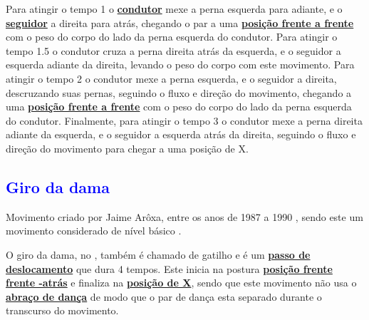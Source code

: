 Para atingir o tempo 1 o \hyperref[def:Condutor]{\textbf{condutor}} mexe a perna esquerda para adiante, 
e o \hyperref[def:Seguidor]{\textbf{seguidor}}  a direita para atrás,
chegando o par a uma \hyperref[def:frente-frente-position]{\textbf{posição frente a frente}}
com o peso do corpo do lado da perna esquerda do condutor.
Para atingir o tempo 1.5 o condutor cruza a perna direita atrás da esquerda,
e o seguidor a esquerda adiante da direita, levando o peso do corpo com este movimento.
Para atingir o tempo 2 o condutor mexe a perna esquerda, e o seguidor a direita,
descruzando suas pernas, seguindo o fluxo e direção do movimento,
chegando a uma \hyperref[def:frente-frente-position]{\textbf{posição frente a frente}}
com o peso do corpo do lado da perna esquerda do condutor.
Finalmente, para atingir o tempo 3 o condutor mexe a perna direita adiante da esquerda,
e o seguidor a esquerda atrás da direita, 
seguindo o fluxo e direção do movimento para chegar a uma posição de X. 

\subsection{\textcolor{blue}{Giro da dama}}
Movimento criado por Jaime Arôxa, entre os anos de 1987 a 1990 \cite{EntrevistaJaimeAroxa1},
sendo este um movimento considerado de nível básico \cite[pp. 144]{perna2002samba}.

O giro da dama, no \AnoLivro, também é chamado de gatilho e 
é um \hyperref[def:PassoDeDeslocamento]{\textbf{passo de deslocamento}} que dura 4 tempos.
Este inicia na postura \hyperref[def:ffa-position]{\textbf{posição frente frente -atrás}} e 
finaliza na \hyperref[def:X-position]{\textbf{posição de X}},
sendo que este movimento não usa o \hyperref[def:abracodedanca]{\textbf{abraço de dança}} 
de modo que o par de dança esta separado durante o transcurso do movimento.

